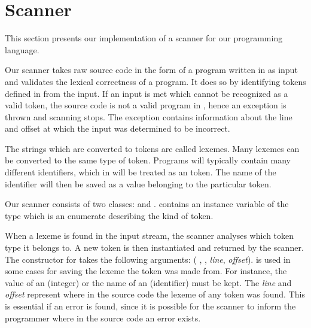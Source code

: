 \section{Scanner}
\label{sec:scannerimplementation}
This section presents our implementation of a scanner for our programming language.

Our scanner takes raw source code in the form of a program written in
\productname{} as input and validates the lexical correctness of a
\productname{} program. It does so by identifying
tokens defined in \productname{} from the input. If an input is met
which cannot be recognized as a valid token, the source code is not
a valid program in \productname{}, hence an exception is thrown and
scanning stops. The exception contains information about the line and
offset at which the input was determined to be incorrect.

The strings which are converted to tokens are called lexemes. Many
lexemes can be converted to the same type of token. Programs will
typically contain many different identifiers, which in \productname{}
will be treated as an  token. The name of the identifier will
then be saved as a value belonging to the particular token.


Our scanner consists of two classes:  and
.  contains an instance variable of the 
type  which is an enumerate describing the kind of token.

When a lexeme is found in the input stream, the scanner analyses which token
type it belongs to. A new token is then instantiated and returned by the
scanner. The constructor for  takes the following arguments:
( ,  ,
 \textit{line},  \textit{offset}).  
is used in some cases for saving the lexeme the token was made from. For
instance, the value of an  (integer) or the name of an
 (identifier) must be kept. The \textit{line} and \textit{offset}
represent where in the source code the lexeme of any token was found. This is
essential if an error is found, since it is possible for the scanner to inform
the programmer where in the source code an error exists.

